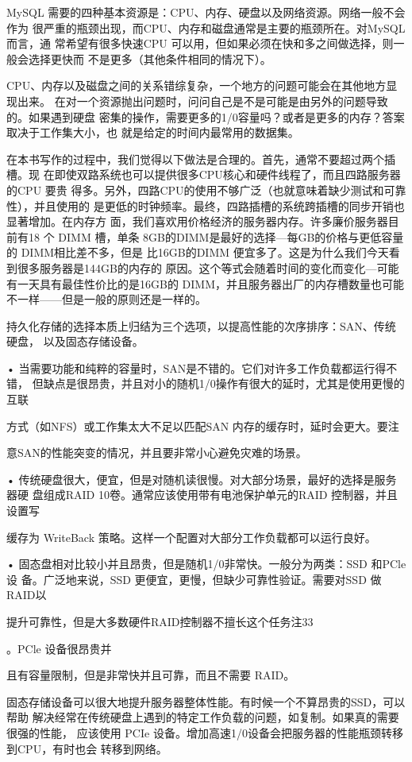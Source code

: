 MySQL 需要的四种基本资源是：CPU、内存、硬盘以及网络资源。网络一般不会作为
很严重的瓶颈出现，而CPU、内存和磁盘通常是主要的瓶颈所在。对MySQL 而言，通
常希望有很多快速CPU 可以用，但如果必须在快和多之间做选择，则一般会选择更快而
不是更多（其他条件相同的情况下）。

CPU、内存以及磁盘之间的关系错综复杂，一个地方的问题可能会在其他地方显现出来。
在对一个资源抛出问题时，问问自己是不是可能是由另外的问题导致的。如果遇到硬盘
密集的操作，需要更多的1/0容量吗？或者是更多的内存？答案取决于工作集大小，也
就是给定的时间内最常用的数据集。

在本书写作的过程中，我们觉得以下做法是合理的。首先，通常不要超过两个插槽。现
在即使双路系统也可以提供很多CPU核心和硬件线程了，而且四路服务器的CPU 要贵
得多。另外，四路CPU的使用不够广泛（也就意味着缺少测试和可靠性），并且使用的
是更低的时钟频率。最终，四路插槽的系统跨插槽的同步开销也显著增加。在内存方
面，我们喜欢用价格经济的服务器内存。许多廉价服务器目前有18 个 DIMM 槽，单条
8GB的DIMM是最好的选择—每GB的价格与更低容量的 DIMM相比差不多，但是
比16GB的DIMM 便宜多了。这是为什么我们今天看到很多服务器是144GB的内存的
原因。这个等式会随着时间的变化而变化—可能有一天具有最佳性价比的是16GB的
DIMM，并且服务器出厂的内存槽数量也可能不一样——但是一般的原则还是一样的。

持久化存储的选择本质上归结为三个选项，以提高性能的次序排序：SAN、传统硬盘，
以及固态存储设备。

• 当需要功能和纯粹的容量时，SAN是不错的。它们对许多工作负载都运行得不错，
但缺点是很昂贵，并且对小的随机1/0操作有很大的延时，尤其是使用更慢的互联

方式（如NFS）或工作集太大不足以匹配SAN 内存的缓存时，延时会更大。要注

意SAN的性能突变的情况，并且要非常小心避免灾难的场景。

• 传统硬盘很大，便宜，但是对随机读很慢。对大部分场景，最好的选择是服务器硬
盘组成RAID 10卷。通常应该使用带有电池保护单元的RAID 控制器，并且设置写

缓存为 WriteBack 策略。这样一个配置对大部分工作负载都可以运行良好。

• 固态盘相对比较小并且昂贵，但是随机1/0非常快。一般分为两类：SSD 和PCle 设
备。广泛地来说，SSD 更便宜，更慢，但缺少可靠性验证。需要对SSD 做RAID以

提升可靠性，但是大多数硬件RAID控制器不擅长这个任务注33

。PCle 设备很昂贵并

且有容量限制，但是非常快并且可靠，而且不需要 RAID。

固态存储设备可以很大地提升服务器整体性能。有时候一个不算昂贵的SSD，可以帮助
解决经常在传统硬盘上遇到的特定工作负载的问题，如复制。如果真的需要很强的性能，
应该使用 PCIe 设备。增加高速1/0设备会把服务器的性能瓶颈转移到CPU，有时也会
转移到网络。

